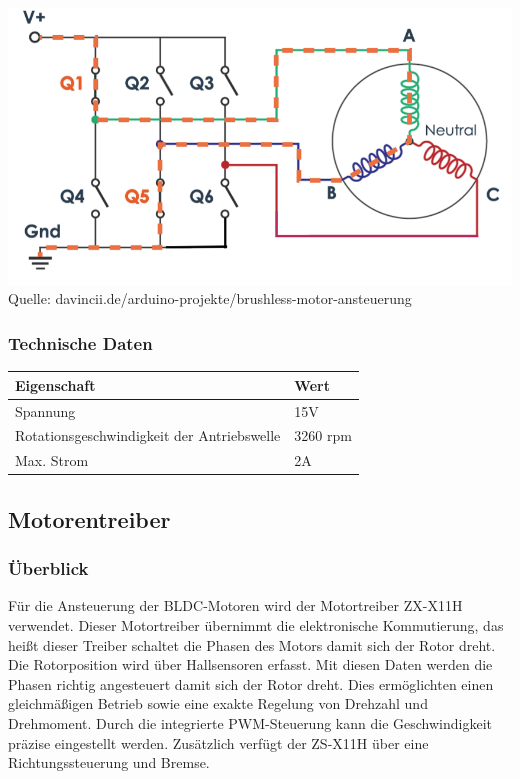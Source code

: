 \documentclass[ngerman,12pt,a4paper]{article}
\begin{document}
			\begin{center}
				\begin{minipage}{\textwidth}
					\centering
					\includegraphics[scale=0.6]{Pictures/Phasen_steuerung}
					\label{fig:spiffs_init}
					\vspace{-2pt}
					\small Quelle: davincii.de/arduino-projekte/brushless-motor-ansteuerung
				\end{minipage}
			\end{center}
			
			\subsubsection{Technische Daten}
			
			\begin{tabular}{| l | l |}  
				\hline  
				\textbf{Eigenschaft} & \textbf{Wert} \\   
				\hline  
				Spannung & 15V \\  
				\hline  
				Rotationsgeschwindigkeit der Antriebswelle & 3260 rpm \\  
				\hline  
				Max. Strom & 2A \\  
				\hline  
			\end{tabular}
			
		\subsection{Motorentreiber} %
		
			\subsubsection{Überblick}
		Für die Ansteuerung der BLDC-Motoren wird der Motortreiber ZX-X11H verwendet. Dieser Motortreiber übernimmt die elektronische Kommutierung, das heißt dieser Treiber schaltet die Phasen des Motors damit sich der Rotor dreht. Die Rotorposition wird über Hallsensoren erfasst. Mit diesen Daten werden die Phasen richtig angesteuert damit sich der Rotor dreht. Dies ermöglichten einen gleichmäßigen Betrieb sowie eine exakte Regelung von Drehzahl und Drehmoment. Durch die integrierte PWM-Steuerung kann die Geschwindigkeit präzise eingestellt werden. Zusätzlich verfügt der ZS-X11H über eine Richtungssteuerung und Bremse.
		
\end{document}
